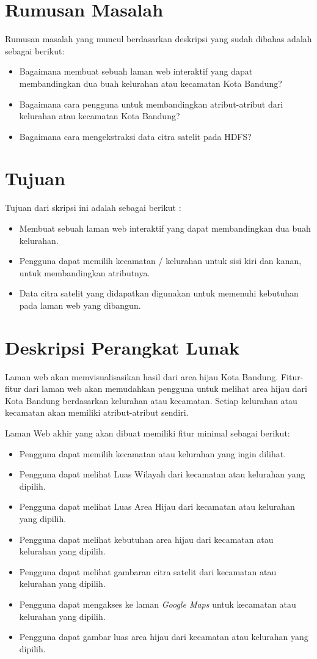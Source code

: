 \documentclass[a4paper,twoside]{article}
\begin{document}
\section{Rumusan Masalah}
Rumusan masalah yang muncul berdasarkan deskripsi yang sudah dibahas
adalah sebagai berikut:
\begin{itemize}
	\item Bagaimana membuat sebuah laman web interaktif yang dapat membandingkan dua buah kelurahan atau kecamatan Kota Bandung?
	\item Bagaimana cara pengguna untuk membandingkan atribut-atribut dari kelurahan atau kecamatan Kota Bandung?
	\item Bagaimana cara mengekstraksi data citra satelit pada HDFS?
\end{itemize}

\section{Tujuan}
Tujuan dari skripsi ini adalah sebagai berikut :
\begin{itemize}
	\item Membuat sebuah laman web interaktif yang dapat membandingkan dua buah kelurahan.
	\item Pengguna dapat memilih kecamatan / kelurahan untuk sisi kiri dan kanan, untuk membandingkan atributnya.
	\item Data citra satelit yang didapatkan digunakan untuk memenuhi kebutuhan pada laman web yang dibangun.
\end{itemize}

\section{Deskripsi Perangkat Lunak}
Laman web akan memvisualisasikan hasil dari area hijau Kota Bandung. Fitur-fitur dari laman web akan memudahkan pengguna untuk melihat area hijau dari Kota Bandung berdasarkan kelurahan atau kecamatan. Setiap kelurahan atau kecamatan akan memiliki atribut-atribut sendiri.

Laman Web akhir yang akan dibuat memiliki fitur minimal sebagai berikut:
\begin{itemize}
	\item Pengguna dapat memilih kecamatan atau kelurahan yang ingin dilihat.
	\item Pengguna dapat melihat Luas Wilayah dari kecamatan atau kelurahan yang dipilih.
	\item Pengguna dapat melihat Luas Area Hijau dari kecamatan atau kelurahan yang dipilih.
	\item Pengguna dapat melihat kebutuhan area hijau dari kecamatan atau kelurahan yang dipilih.
	\item Pengguna dapat melihat gambaran citra satelit dari kecamatan atau kelurahan yang dipilih.
	\item Pengguna dapat mengakses ke laman \emph{Google Maps} untuk kecamatan atau kelurahan yang dipilih.
	\item Pengguna dapat gambar luas area hijau dari kecamatan atau kelurahan yang dipilih.
		
\end{itemize}
\end{document}
